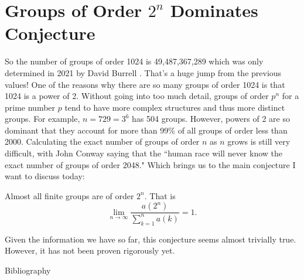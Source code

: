\documentclass{article}
\newenvironment{conjecture}[2][Conjecture]{\begin{trivlist}
\item[\hskip \labelsep {\bfseries #1}\hskip \labelsep {\bfseries #2.}]}
{\end{trivlist}}
\begin{document}
\pagebreak

\section{Groups of Order $2^n$ Dominates Conjecture}
So the number of groups of order 1024 is 49,487,367,289 
which was only determined in 2021 by David Burrell \cite{burrell2022number}. 
That's a huge jump from the previous values! One of the reasons why
there are so many groups of order 1024 is that 1024 is a power of 2.
Without going into too much detail, groups of order $p^n$ 
for a prime number $p$ tend to have more complex structures and 
thus more distinct groups.
For example, $n = 729 = 3^6$ has 504 groups. However, powers of 2 are so
dominant that they account for more than 99\% of all groups of order 
less than 2000. Calculating the exact number of groups of 
order $n$ as $n$ grows is still very difficult, 
with John Conway saying that the ``human race will never know the 
exact number of groups of order 2048."
Which brings us to the main conjecture I want to discuss today:
\begin{conjecture}{Groups of Order $2^n$ Dominates}
    Almost all finite groups are of order $2^n$. That is
    \[
        \lim_{n \to \infty} \frac{a(2^n)}{\sum_{k=1}^{n} a(k)} = 1.
    \]
\end{conjecture}
Given the information we have so far, this conjecture seems almost
trivially true. However, it has not been proven rigorously yet.

\begin{section}{Bibliography}
    
    
\end{section}
\end{document}

